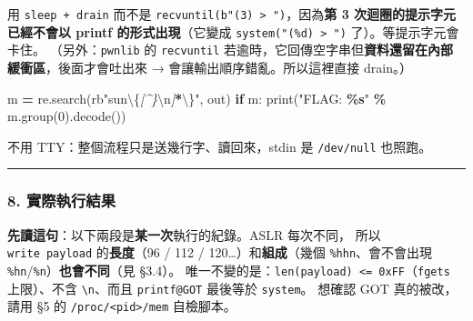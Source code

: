 \documentclass[10pt,a4paper]{article}
\newenvironment{Shaded}{\begin{snugshade}}{\end{snugshade}}
\newcommand{\BuiltInTok}[1]{#1}
\newcommand{\CharTok}[1]{\textcolor[rgb]{0.31,0.60,0.02}{#1}}
\newcommand{\ControlFlowTok}[1]{\textcolor[rgb]{0.13,0.29,0.53}{\textbf{#1}}}
\newcommand{\DecValTok}[1]{\textcolor[rgb]{0.00,0.00,0.81}{#1}}
\newcommand{\NormalTok}[1]{#1}
\newcommand{\OperatorTok}[1]{\textcolor[rgb]{0.81,0.36,0.00}{\textbf{#1}}}
\newcommand{\PreprocessorTok}[1]{\textcolor[rgb]{0.56,0.35,0.01}{\textit{#1}}}
\newcommand{\SpecialCharTok}[1]{\textcolor[rgb]{0.81,0.36,0.00}{\textbf{#1}}}
\newcommand{\StringTok}[1]{\textcolor[rgb]{0.31,0.60,0.02}{#1}}
\newcommand{\VerbatimStringTok}[1]{\textcolor[rgb]{0.31,0.60,0.02}{#1}}
\renewenvironment{Shaded}{%
  \def\FrameCommand{\fboxsep=3.2pt\colorbox{shadecolor}}%
  \MakeFramed{\advance\hsize-\width\FrameRestore\small}%
}{%
  \endMakeFramed
}
\renewenvironment{quote}{%
  \begin{mdframed}[linewidth=0pt,innerleftmargin=0pt,innerrightmargin=0pt,
    innerbottommargin=0pt,innertopmargin=0pt,skipabove=0.55em,skipbelow=0.55em,
    leftmargin=0.9em,rightmargin=0.4em,startcode={\color{quotebar}\vrule width 2.6pt},%
    endcode={}]%
  \itshape\color{black}%
}{%
  \end{mdframed}%
}
\begin{document}
用 \texttt{sleep\ \allowbreak{}+\ \allowbreak{}drain} 而不是
\texttt{recvuntil(b"(3)\ \allowbreak{}\textgreater{}\allowbreak{}\ \allowbreak{}")}，因為\textbf{第 3
次迴圈的提示字元已經不會以 printf 的形式出現}（它變成
\texttt{system("(\%\allowbreak{}d)\ \allowbreak{}\textgreater{}\allowbreak{}\ \allowbreak{}")} 了）。等提示字元會卡住。
（另外：\texttt{pwnlib} 的 \texttt{recvuntil}
若逾時，它回傳空字串但\textbf{資料還留在內部緩衝區}，後面才會吐出來 →
會讓輸出順序錯亂。所以這裡直接 drain。）

\begin{Shaded}
\begin{Highlighting}[]
\NormalTok{    m }\OperatorTok{=}\NormalTok{ re.search(}\VerbatimStringTok{rb"sun}\CharTok{\textbackslash{}\{}\PreprocessorTok{[\^{}\}}\CharTok{\textbackslash{}n}\PreprocessorTok{]}\OperatorTok{*}\CharTok{\textbackslash{}\}}\VerbatimStringTok{"}\NormalTok{, out)}
    \ControlFlowTok{if}\NormalTok{ m: }\BuiltInTok{print}\NormalTok{(}\StringTok{"FLAG: }\SpecialCharTok{\%s}\StringTok{"} \OperatorTok{\%}\NormalTok{ m.group(}\DecValTok{0}\NormalTok{).decode())}
\end{Highlighting}
\end{Shaded}

不用 TTY：整個流程只是送幾行字、讀回來，stdin 是 \texttt{/\allowbreak{}dev/\allowbreak{}null}
也照跑。

\begin{center}\rule{0.5\linewidth}{0.5pt}\end{center}

\subsubsection{8.
實際執行結果}\label{ux5be6ux969bux57f7ux884cux7d50ux679c-1}

\begin{quote}
\textbf{先讀這句}：以下兩段是\textbf{某一次}執行的紀錄。ASLR 每次不同，
所以 \texttt{write\ \allowbreak{}payload} 的\textbf{長度}（96 / 112 /
120\ldots）和\textbf{組成}（幾個 \texttt{\%\allowbreak{}hhn}、會不會出現
\texttt{\%\allowbreak{}hn}/\texttt{\%\allowbreak{}n}）\textbf{也會不同}（見 §3.4）。
唯一不變的是：\texttt{len(payload)\ \allowbreak{}\textless{}\allowbreak{}=\ \allowbreak{}0xFF}（\texttt{fgets}
上限）、不含 \texttt{\textbackslash{}\allowbreak{}n}、而且 \texttt{printf@GOT}
最後等於 \texttt{system}。 想確認 GOT 真的被改，請用 §5 的
\texttt{/\allowbreak{}proc/\allowbreak{}\textless{}\allowbreak{}pid\textgreater{}\allowbreak{}/\allowbreak{}mem} 自檢腳本。
\end{quote}
\end{document}
